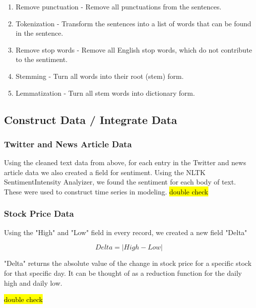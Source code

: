 \documentclass[sigconf, nonacm]{acmart}
\begin{document}
\begin{enumerate}
    \item Remove punctuation - Remove all punctuations from the sentences.
    \item Tokenization - Transform the sentences into a list of words that can be found in the sentence.
    \item Remove stop words - Remove all English stop words, which do not contribute to the sentiment.
    \item Stemming - Turn all words into their root (stem) form.
    \item Lemmatization - Turn all stem words into dictionary form.
\end{enumerate}



\subsection{Construct Data / Integrate Data } 

\subsubsection{Twitter and News Article Data}
Using the cleaned text data from above, for each entry in the Twitter and news article data we also created a field for sentiment. Using the NLTK SentimentIntensity Analyizer, we found the sentiment for each body of text. These were used to construct time series in modeling.
\hl{double check}

\subsubsection{Stock Price Data}
Using the "High" and "Low" field in every record, we created a new field "Delta"

$$ Delta = |High - Low|$$

"Delta" returns the absolute value of the change in stock price for a specific stock for that specific day. It can be thought of as a reduction function for the daily high and daily low.

\hl{double check}

\end{document}

